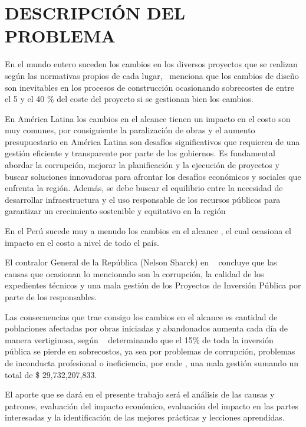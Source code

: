 \pagestyle{myheadings}

\chapter{DESCRIPCIÓN DEL PROBLEMA}
En el mundo entero suceden los cambios en los diversos proyectos que se realizan según las normativas propios de cada lugar,~\cite{Aslam2019} menciona que los cambios de diseño son inevitables en los procesos de construcción ocasionando sobrecostes de entre el 5 y el 40 \% del coste del proyecto si se gestionan bien los cambios.

En América Latina los cambios en el alcance tienen un impacto en el costo son muy comunes, por consiguiente la paralización de obras y el aumento presupuestario en América Latina son desafíos significativos que requieren de una gestión eficiente y transparente por parte de los gobiernos. Es fundamental abordar la corrupción, mejorar la planificación y la ejecución de proyectos y buscar soluciones innovadoras para afrontar los desafíos económicos y sociales que enfrenta la región. Además, se debe buscar el equilibrio entre la necesidad de desarrollar infraestructura y el uso responsable de los recursos públicos para garantizar un crecimiento sostenible y equitativo en la región ~\cite[pag.~04]{BID2018}

En el Perú sucede muy a menudo los cambios en el alcance , el cual ocasiona el impacto en el costo a nivel de todo el país.

El contralor General de la República (Nelson Sharck) en ~\cite{CuartoPoder2022} concluye que las causas que ocasionan lo mencionado son la corrupción, la calidad de los expedientes técnicos y una mala gestión de los Proyectos de Inversión Pública por parte de los responsables.

Las consecuencias que trae consigo los cambios en el alcance es cantidad de poblaciones afectadas por obras iniciadas y abandonados aumenta cada día de manera vertiginosa, según ~\cite{CGRP2023} determinando que el 15\% de toda la inversión pública se pierde en sobrecostos, ya sea por problemas de corrupción, problemas de inconducta profesional o ineficiencia, por ende , una mala gestión sumando un total de \$ 29,732,207,833.

El aporte que se dará en el presente trabajo será el análisis de las causas y patrones, evaluación del impacto económico, evaluación del impacto en las partes interesadas y la identificación de las mejores prácticas y lecciones aprendidas.

